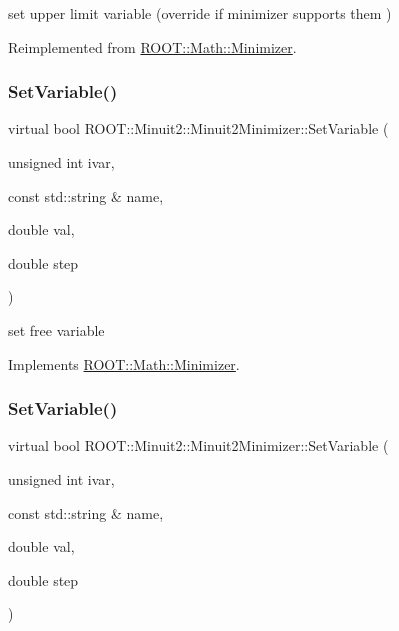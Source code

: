 set upper limit variable (override if minimizer supports them ) 



Reimplemented from \mbox{\hyperlink{classROOT_1_1Math_1_1Minimizer_a804843fbaea82809b3c54232d0c1fe86}{R\+O\+O\+T\+::\+Math\+::\+Minimizer}}.

\mbox{\label{classROOT_1_1Minuit2_1_1Minuit2Minimizer_a951ad856f74ded3c64836fa28fdf9bb5}} 
\subsubsection{\texorpdfstring{SetVariable()}{SetVariable()}\hspace{0.1cm}{\footnotesize\ttfamily [1/2]}}
{\footnotesize\ttfamily virtual bool R\+O\+O\+T\+::\+Minuit2\+::\+Minuit2\+Minimizer\+::\+Set\+Variable (\begin{DoxyParamCaption}\item[{unsigned int}]{ivar,  }\item[{const std\+::string \&}]{name,  }\item[{double}]{val,  }\item[{double}]{step }\end{DoxyParamCaption})\hspace{0.3cm}{\ttfamily [virtual]}}



set free variable 



Implements \mbox{\hyperlink{classROOT_1_1Math_1_1Minimizer_a8661a2ac86372602f32f97b3d9262421}{R\+O\+O\+T\+::\+Math\+::\+Minimizer}}.

\mbox{\label{classROOT_1_1Minuit2_1_1Minuit2Minimizer_a951ad856f74ded3c64836fa28fdf9bb5}} 
\subsubsection{\texorpdfstring{SetVariable()}{SetVariable()}\hspace{0.1cm}{\footnotesize\ttfamily [2/2]}}
{\footnotesize\ttfamily virtual bool R\+O\+O\+T\+::\+Minuit2\+::\+Minuit2\+Minimizer\+::\+Set\+Variable (\begin{DoxyParamCaption}\item[{unsigned int}]{ivar,  }\item[{const std\+::string \&}]{name,  }\item[{double}]{val,  }\item[{double}]{step }\end{DoxyParamCaption})\hspace{0.3cm}{\ttfamily [virtual]}}




